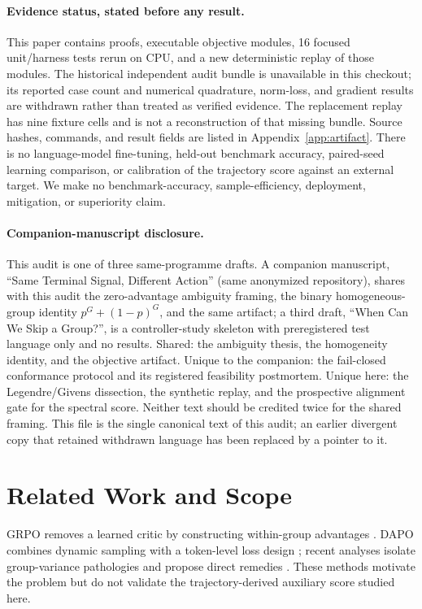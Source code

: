 \documentclass{article}
\newcommand{\grpo}{\textsc{GRPO}\xspace}
\newcommand{\companionpath}{(same anonymized repository)}
\newcommand{\companionpath}{(\path{zvf-program/flagship/paper/main.tex})}
\begin{document}
\paragraph{Evidence status, stated before any result.}
This paper contains proofs, executable objective modules, 16 focused
unit/harness tests rerun on CPU, and a new deterministic replay of those
modules. The historical independent audit bundle is unavailable in this
checkout; its reported case count and numerical quadrature, norm-loss, and
gradient results are withdrawn rather than treated as verified evidence.
The replacement replay has nine fixture cells and is not a reconstruction
of that missing bundle. Source hashes, commands, and result fields are
listed in Appendix~\ref{app:artifact}.
There is no language-model fine-tuning, held-out benchmark accuracy,
paired-seed learning comparison, or calibration of the trajectory score against
an external target. We make no benchmark-accuracy, sample-efficiency,
deployment, mitigation, or superiority claim.

\paragraph{Companion-manuscript disclosure.}
This audit is one of three same-programme drafts. A companion manuscript,
``Same Terminal Signal, Different Action'' \companionpath, shares with this
audit the zero-advantage ambiguity framing, the binary homogeneous-group
identity $p^G+(1-p)^G$, and the same  artifact; a
third draft, ``When Can We Skip a Group?'', is a controller-study skeleton
with preregistered test language only and no results. Shared: the ambiguity
thesis, the homogeneity identity, and the objective artifact. Unique to the
companion: the fail-closed conformance protocol and its registered
feasibility postmortem. Unique here: the Legendre/Givens dissection, the
synthetic replay, and the prospective alignment gate for the spectral
score. Neither text should be credited twice for the shared framing. This
file is the single canonical text of this audit; an earlier divergent copy
that retained withdrawn language has been replaced by a pointer to it.

\section{Related Work and Scope}

\grpo removes a learned critic by constructing within-group advantages
\citep{shao2024deepseekmath}.  DAPO combines dynamic sampling with a
token-level loss design \citep{yu2025dapo}; recent analyses isolate
group-variance pathologies and propose direct remedies
\citep{nie2026gradient,he2026advantage}.  These methods motivate the problem
but do not validate the trajectory-derived auxiliary score studied here.
\end{document}
